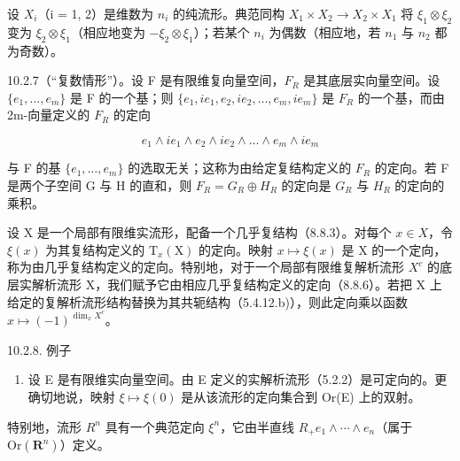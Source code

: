 设 \(X_{i}\)（i = 1, 2）是维数为 \(n_{i}\) 的纯流形。典范同构 \(X_{1} \times X_{2} \to X_{2} \times X_{1}\) 将 \(\xi_{1} \otimes \xi_{2}\) 变为 \(\xi_{2} \otimes \xi_{1}\)（相应地变为 \(-\xi_{2} \otimes \xi_{1}\)）；若某个 \(n_{i}\) 为偶数（相应地，若 \(n_{1}\) 与 \(n_{2}\) 都为奇数）。

10.2.7（“复数情形”）。设 F 是有限维复向量空间，\(F_{R}\) 是其底层实向量空间。设 \(\{e_{1},\ldots,e_{m}\}\) 是 F 的一个基；则 \(\{e_{1},ie_{1},e_{2},ie_{2},\ldots,e_{m},ie_{m}\}\) 是 \(F_{R}\) 的一个基，而由 2m-向量定义的 \(F_{R}\) 的定向

\[
e _ {1} \wedge i e _ {1} \wedge e _ {2} \wedge i e _ {2} \wedge \dots \wedge e _ {m} \wedge i e _ {m}
\]

与 F 的基 \(\{e_{1},\ldots,e_{m}\}\) 的选取无关；这称为由给定复结构定义的 \(F_{R}\) 的定向。若 F 是两个子空间 G 与 H 的直和，则 \(F_{R}=G_{R}\oplus H_{R}\) 的定向是 \(G_{R}\) 与 \(H_{R}\) 的定向的乘积。

设 X 是一个局部有限维实流形，配备一个几乎复结构（8.8.3）。对每个 \(x \in X\)，令 \(\xi(x)\) 为其复结构定义的 \(\mathrm{T}_{x}(\mathrm{X})\) 的定向。映射 \(x \mapsto \xi(x)\) 是 X 的一个定向，称为由几乎复结构定义的定向。特别地，对于一个局部有限维复解析流形 \(X^{c}\) 的底层实解析流形 X，我们赋予它由相应几乎复结构定义的定向（8.8.6）。若把 X 上给定的复解析流形结构替换为其共轭结构（5.4.12.b)），则此定向乘以函数 \(x \mapsto (-1)^{\dim_{x} X^{c}}\)。

10.2.8. 例子

\begin{enumerate}
\def\labelenumi{\alph{enumi})}
\tightlist
\item
  设 E 是有限维实向量空间。由 E 定义的实解析流形（5.2.2）是可定向的。更确切地说，映射 \(\xi \mapsto \xi(0)\) 是从该流形的定向集合到 Or(E) 上的双射。
\end{enumerate}

特别地，流形 \(R^{n}\) 具有一个典范定向 \(\xi^{n}\)，它由半直线 \(R_{+}e_{1}\wedge\cdots\wedge e_{n}\)（属于 \(\mathrm{Or}(\mathbf{R}^{n})\)）定义。

